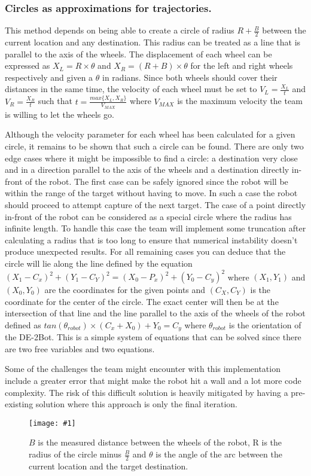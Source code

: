 \documentclass[12pt,conference,onecolumn]{IEEEtran} %
\newcommand{\myfigure}[4]{
  \begin{figure}[h!]
      \centering
      \texttt{[image: \#1]}
      \caption{#2}
\label{#4}
    \end{figure}
}
\begin{document}
\subsubsection{Circles as approximations for trajectories.}
This method depends on being able to create a circle of radius $R+\frac{B}{2}$ between the current location and any destination. This radius can be treated as a line that is parallel to the axis of the wheels. The displacement of each wheel can be expressed as $X_{L} = R \times \theta$ and $X_{R} = (R + B) \times \theta$ for the left and right wheels respectively and given a $\theta$ in radians. Since both wheels should cover their distances in the same time, the velocity of each wheel must be set to $V_{L} = \frac{X_{L}}{t}$ and  $V_{R} = \frac{X_{R}}{t}$ such that $t  = \frac{max\{X_{L}, X_{R}\}}{V_{MAX}}$ where $V_{MAX}$ is the maximum velocity the team is  willing to let the wheels go.\par
Although the velocity parameter for each wheel has been calculated for a given circle, it remains to be shown that such a circle can be found. There are only two edge cases where it might be impossible to find a circle: a destination very close and in a direction parallel to the axis of the wheels and a destination directly in-front of the robot. The first case can be safely ignored since the robot will be within the range of the target without having to move. In such a case the robot should proceed to attempt capture of the next target. The case of a point directly in-front of the robot can be considered as a special circle where the radius has infinite length. To handle this case the team will implement some truncation after calculating a radius that is too long to ensure that numerical instability doesn't produce unexpected results. For all remaining cases you can deduce that the circle will lie along the line defined by the equation $(X_1 - C_x)^2 + (Y_1 - C_Y)^2 = (X_0 - P_x)^2 + (Y_0 - C_y)^2$ where $(X_1,Y_1)$ and $(X_0,Y_0)$ are the coordinates for the given points and $(C_X,C_Y)$ is the coordinate for the center of the circle. The exact center will then be at the intersection of that line and the line parallel to the axis of the wheels of the robot defined as $tan(\theta_{robot}) \times (C_x + X_0) + Y_0 = C_y$ where $\theta_{robot}$ is the orientation of the DE-2Bot. This is a simple system of equations that can be solved since there are two free variables and two equations.\par
Some of the challenges the team might encounter with this implementation include a greater error that might make the robot hit a wall and a lot more code complexity. The risk of this difficult solution is heavily mitigated by having a pre-existing solution where this approach is only the final iteration.
\myfigure{images/robotCircle.png}{$B$ is the measured distance between the wheels of the robot, R is the radius of the circle minus $\frac{B}{2}$ and $\theta$ is the angle of the arc between the current location and the target destination.}{0.5}{fig:robotCircle}
\end{document}
